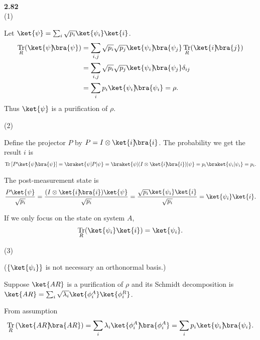 \documentclass[10pt]{book}
\DeclareMathOperator{\Tr}{Tr}
\newcommand{\kb}[1]{\ket{#1}\hspace{-1mm} \bra{#1}} %
\newcommand{\kbt}[2]{\ket{#1}\hspace{-1mm} \bra{#2}} %
\newcommand{\Textbf}[1]{\hspace{3mm}\\ \textbf{#1}\\}
\begin{document}
	
	\Textbf{2.82}
	
	(1)
	
	Let $\ket{\psi} = \sum_i \sqrt{p_i} \ket{\psi_i} \ket{i}$.
	\begin{equation}
\begin{aligned}
		\Tr_R (\kb{\psi})
		&= \sum_{i,j} \sqrt{p_i} \sqrt{p_j} \kbt{\psi_i}{\psi_j} \Tr_R (\kbt{i}{j})\\
		&= \sum_{i,j} \sqrt{p_i} \sqrt{p_j} \kbt{\psi_i}{\psi_j} \delta_{ij}\\
		&= \sum_i p_i \kb{\psi_i} = \rho.
	\end{aligned}
\end{equation}
	Thus $\ket{\psi}$ is a purification of $\rho$.
	
	\vspace{5mm}
	(2)
	
	Define the projector $P$ by $P = I \otimes \kb{i}$.
	The probability we get the result $i$ is
	\begin{equation}
\begin{aligned}
		\Tr \left[ P \kb{\psi}\right] = \braket{\psi | P | \psi} = \braket{\psi | (I \otimes \kb{i}) | \psi} = p_i \braket{\psi_i | \psi_i} = p_i.
	\end{aligned}
\end{equation}
	
	The post-measurement state is
	\begin{equation}
\begin{aligned}
		\frac{P \ket{\psi}}{\sqrt{p_i}}
		= \frac{(I \otimes \kb{i}) \ket{\psi}}{\sqrt{p_i}}
		= \frac{\sqrt{p_i} \ket{\psi_i}\ket{i}}{\sqrt{p_i}} = \ket{\psi_i}\ket{i}.
	\end{aligned}
\end{equation}
	
	If we only focus on the state on system $A$,
	\begin{equation}
\begin{aligned}
		\Tr_R (\ket{\psi_i} \ket{i}) = \ket{\psi_i}.
	\end{aligned}
\end{equation}
	
	\vspace{5mm}
	(3)
	
	($\{ \ket{\psi_i} \}$ is not necessary an orthonormal basis.)
	
	
	Suppose $\ket{AR}$ is a purification of $\rho$ and its Schmidt decomposition is $\ket{AR} = \sum_i \sqrt{\lambda_i} \ket{\phi_i^A} \ket{\phi_i^R}$.
	
	From assumption
	\begin{equation}
\begin{aligned}
		\Tr_R \left( \kb{AR} \right) = \sum_i \lambda_i \kb{\phi_i^A} = \sum_i p_i \kb{\psi_i}.
	\end{aligned}
\end{equation}
	
\end{document}
